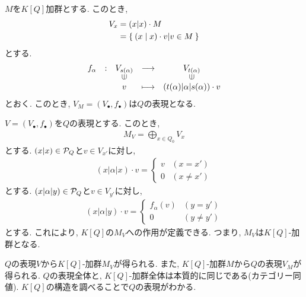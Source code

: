 \begin{remark}
$M$を$K[Q]$加群とする.
このとき,
\begin{align*}
  V_x&= (x|x)\cdot M\\
  &=\Set{(x|x)\cdot v | v\in M}
\end{align*}
とする.
\begin{align*}
  \shazo{f_\alpha}
  {V_{s(\alpha)}}{V_{t(\alpha)}}
  {v}{(t(\alpha)|\alpha|s(\alpha))\cdot v}
\end{align*}
とおく.
このとき,
$V_M=(V_\bullet,f_\bullet)$は$Q$の表現となる.
\end{remark}
\begin{remark}
  $V=(V_\bullet,f_\bullet)$を$Q$の表現とする.
  このとき,
  \begin{align*}
    M_{V}=\bigoplus_{x\in Q_0} V_x
  \end{align*}
  とする.
  $(x|x)\in \mathcal{P}_Q$と$v\in V_{x'}$に対し,
  \begin{align*}
    (x|\alpha|x)\cdot v =
    \begin{cases}
      v & (x=x')\\
      0 & (x\neq x')
    \end{cases}
  \end{align*}
  とする.
  $(x|\alpha|y)\in \mathcal{P}_Q$と$v\in V_{y'}$に対し,
  \begin{align*}
    (x|\alpha|y)\cdot v =
    \begin{cases}
      f_\alpha(v) & (y=y')\\
      0 & (y\neq y')
    \end{cases}
  \end{align*}
  とする.
  これにより, $K[Q]$の$M_V$への作用が定義できる.
  つまり, $M_V$は$K[Q]$-加群となる.
\end{remark}
\begin{remark}
  $Q$の表現$V$から$K[Q]$-加群$M_V$が得られる.
  また,
  $K[Q]$-加群$M$から$Q$の表現$V_M$が得られる.
  $Q$の表現全体と,
  $K[Q]$-加群全体は本質的に同じである(カテゴリー同値).
  $K[Q]$の構造を調べることで$Q$の表現がわかる.
\end{remark}

